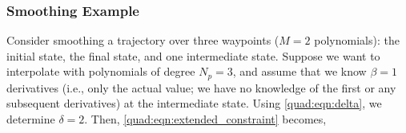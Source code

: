\subsubsection{Smoothing Example}

Consider smoothing a trajectory over three waypoints ($M=2$ polynomials): the initial state, the final state, and one intermediate state. Suppose we want to interpolate with polynomials of degree $N_p = 3$, and assume that we know $\beta = 1$ derivatives (i.e., only the actual value; we have no knowledge of the first or any subsequent derivatives) at the intermediate state. Using \autoref{quad:eqn:delta}, we determine $\delta = 2$. Then, \autoref{quad:eqn:extended_constraint} becomes,
